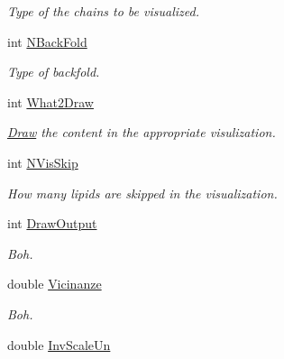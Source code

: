 \begin{DoxyCompactItemize}
\begin{DoxyCompactList}\small\item\em Type of the chains to be visualized. \end{DoxyCompactList}\item 
int \hyperlink{classElPoly_a051cdcf73b2b4af010122eed5c23c59d}{N\+Back\+Fold}\hypertarget{classElPoly_a051cdcf73b2b4af010122eed5c23c59d}{}\label{classElPoly_a051cdcf73b2b4af010122eed5c23c59d}

\begin{DoxyCompactList}\small\item\em Type of backfold. \end{DoxyCompactList}\item 
int \hyperlink{classElPoly_a247a6410f4f46763810a706af08a1c70}{What2\+Draw}\hypertarget{classElPoly_a247a6410f4f46763810a706af08a1c70}{}\label{classElPoly_a247a6410f4f46763810a706af08a1c70}

\begin{DoxyCompactList}\small\item\em \hyperlink{classDraw}{Draw} the content in the appropriate visulization. \end{DoxyCompactList}\item 
int \hyperlink{classElPoly_ae1c44ad3d54bfd33bcd7be4a5d1e9a8c}{N\+Vis\+Skip}\hypertarget{classElPoly_ae1c44ad3d54bfd33bcd7be4a5d1e9a8c}{}\label{classElPoly_ae1c44ad3d54bfd33bcd7be4a5d1e9a8c}

\begin{DoxyCompactList}\small\item\em How many lipids are skipped in the visualization. \end{DoxyCompactList}\item 
int \hyperlink{classElPoly_af2d26fec9f7faeae1c79eb64268776c0}{Draw\+Output}
\begin{DoxyCompactList}\small\item\em Boh. \end{DoxyCompactList}\item 
double \hyperlink{classElPoly_ae8d6419041af331f07d9992abef3a867}{Vicinanze}
\begin{DoxyCompactList}\small\item\em Boh. \end{DoxyCompactList}\item 
double \hyperlink{classElPoly_ae460da3c47449cbbd76b22e9c2501a69}{Inv\+Scale\+Un}\hypertarget{classElPoly_ae460da3c47449cbbd76b22e9c2501a69}{}\label{classElPoly_ae460da3c47449cbbd76b22e9c2501a69}


\end{DoxyCompactItemize}
